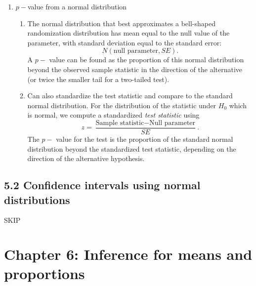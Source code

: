 \documentclass{article}
\begin{document}
\begin{enumerate}
\item $p-$value from a normal distribution
\begin{enumerate}
\item The normal distribution that best approximates a bell-shaped randomization distribution has mean equal to the null value of the parameter, with standard deviation equal to the standard error:
\[
N(\text{null parameter}, SE).
\]
A $p-$ value can be found as the proportion of this normal distribution beyond the observed sample statistic in the direction of the alternative (or twice the smaller tail for a two-tailed test).
\item Can also standardize the test statistic and compare to the standard normal distribution. For the distribution of the statistic under $H_0$ which is normal, we compute a standardized \emph{test statistic} using
\[
z = \frac{\text{Sample statistic} - \text{Null parameter}}{SE}.
\]
The $p-$ value for the test is the proportion of the standard normal distribution beyond the standardized test statistic, depending on the direction of the alternative hypothesis.
\end{enumerate}


\end{enumerate}

\subsection{5.2 Confidence intervals using normal distributions}
SKIP


\section{Chapter 6: Inference for means and proportions}

\end{document}
